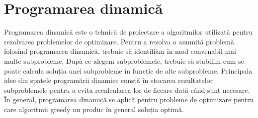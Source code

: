 

\lstset{style=mystyle}

\chapter{Programarea dinamică}
Programarea dinamică este o tehnică de proiectare a algoritmilor utilizată pentru rezolvarea problemelor de optimizare.
Pentru a rezolva o anumită problemă folosind programarea dinamică, trebuie să identifiăm în mod convenabil mai multe subprobleme.
După ce alegem subproblemele, trebuie să stabilim cum se poate calcula soluția unei subprobleme în funcție de alte subprobleme.
Principala idee din spatele programării dinamice constă în stocarea rezultatelor subproblemele pentru a evita recalcularea lor de fiecare dată când sunt necesare. În general, programarea dinamică se aplică pentru probleme de optimizare pentru care algoritmii greedy nu produc în general soluția optimă.

